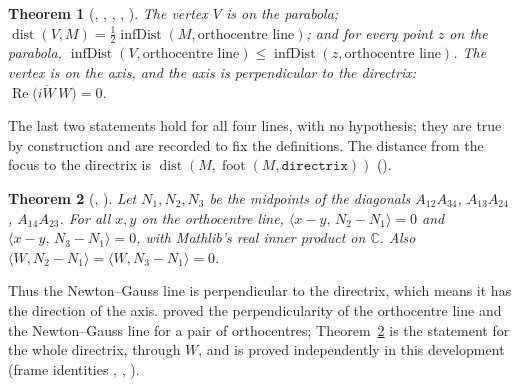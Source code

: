 \documentclass[11pt]{article}
\newtheorem{theorem}{Theorem}
\theoremstyle{definition}
\theoremstyle{remark}
\newcommand{\lean}[1]{\texttt{#1}}
\newcommand{\CC}{\mathbb{C}}
\begin{document}
\begin{theorem}[, , , , ]\label{thm:vertex}
The vertex $V$ is on the parabola; $\operatorname{dist}(V,M)=\tfrac12\operatorname{infDist}(M,\text{orthocentre line})$;
and for every point $z$ on the parabola,
$\operatorname{infDist}(V,\text{orthocentre line})\le\operatorname{infDist}(z,\text{orthocentre line})$.
The vertex is on the axis, and the axis is perpendicular to the directrix:
$\operatorname{Re}\big(\overline{iW}\,W\big)=0$.
\end{theorem}
The last two statements hold for all four lines, with no hypothesis; they are true by construction and
are recorded to fix the definitions. The distance from the focus to the directrix is
$\operatorname{dist}(M,\operatorname{foot}(M,\lean{directrix}))$ ().

\begin{theorem}[, ]\label{thm:newton}
Let $N_1,N_2,N_3$ be the midpoints of the diagonals $A_{12}A_{34}$, $A_{13}A_{24}$, $A_{14}A_{23}$.
For all $x,y$ on the orthocentre line, $\langle x-y,\,N_2-N_1\rangle=0$ and
$\langle x-y,\,N_3-N_1\rangle=0$, with Mathlib's real inner product on $\CC$. Also
$\langle W,N_2-N_1\rangle=\langle W,N_3-N_1\rangle=0$.
\end{theorem}
Thus the Newton--Gauss line is perpendicular to the directrix, which means it has the direction of the
axis. \cite{paperE} proved the perpendicularity of the orthocentre line and the Newton--Gauss line for
a pair of orthocentres; Theorem~\ref{thm:newton} is the statement for the whole directrix, through $W$,
and is proved independently in this development (frame identities ,
, ).
\end{document}
